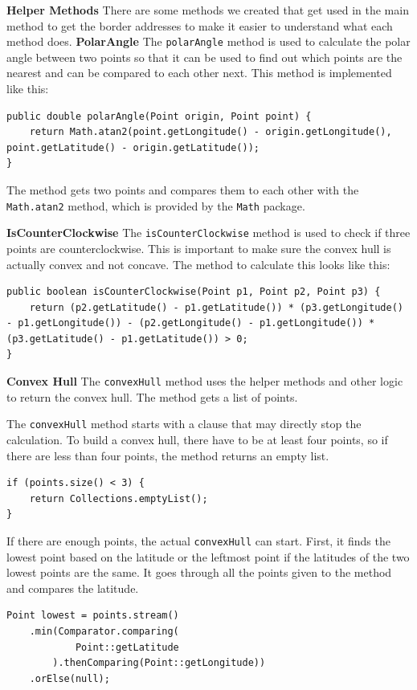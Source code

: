     \textbf{Helper Methods} \newline
    There are some methods we created that get used in the main method to get the border addresses to make it easier to understand what each method does. 
    \textbf{PolarAngle}
    The \texttt{polarAngle} method is used to calculate the polar angle between two points so that it can be used to find out which points are the nearest and can be compared to each other next. This method is implemented like this: 
    \begin{verbatim}
public double polarAngle(Point origin, Point point) {
    return Math.atan2(point.getLongitude() - origin.getLongitude(), point.getLatitude() - origin.getLatitude());
}
    \end{verbatim}
    The method gets two points and compares them to each other with the \texttt{Math.atan2} method, which is provided by the \texttt{Math} package. \newline

    \textbf{IsCounterClockwise} \newline
    The \texttt{isCounterClockwise} method is used to check if three points are counterclockwise. This is important to make sure the convex hull is actually convex and not concave. The method to calculate this looks like this: 
    \begin{verbatim}
public boolean isCounterClockwise(Point p1, Point p2, Point p3) {
    return (p2.getLatitude() - p1.getLatitude()) * (p3.getLongitude() - p1.getLongitude()) - (p2.getLongitude() - p1.getLongitude()) * (p3.getLatitude() - p1.getLatitude()) > 0;
}
    \end{verbatim}

    \textbf{Convex Hull}
    The \texttt{convexHull} method uses the helper methods and other logic to return the convex hull. The method gets a list of points. \newline
    
    The \texttt{convexHull} method starts with a clause that may directly stop the calculation. To build a convex hull, there have to be at least four points, so if there are less than four points, the method returns an empty list.
    \begin{verbatim}
if (points.size() < 3) {
    return Collections.emptyList();
}
    \end{verbatim}
 
    If there are enough points, the actual \texttt{convexHull} can start. First, it finds the lowest point based on the latitude or the leftmost point if the latitudes of the two lowest points are the same. It goes through all the points given to the method and compares the latitude.
    \begin{verbatim}
Point lowest = points.stream()
    .min(Comparator.comparing(
            Point::getLatitude
        ).thenComparing(Point::getLongitude))
    .orElse(null);
    \end{verbatim}

